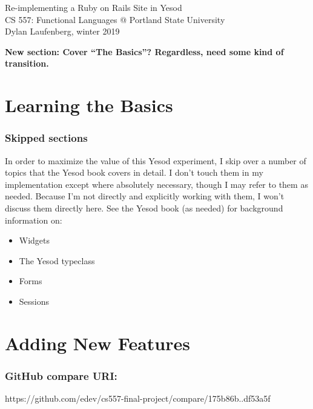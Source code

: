 \documentclass{article}
\newcommand {\todo}[1] {{\textbf{\color{red}#1}}}
\begin{document}
\begin{center}
    \Huge Re-implementing a Ruby on Rails Site in Yesod \\
    \large CS 557: Functional Languages @ Portland State University \\
    Dylan Laufenberg, winter 2019
\end{center}



\todo{New section: Cover ``The Basics''? Regardless, need some kind of transition.}

\part{Learning the Basics}





\section{Skipped sections}

In order to maximize the value of this Yesod experiment, I skip over a number of topics that the Yesod book covers in detail. I don't touch them in my implementation except where absolutely necessary, though I may refer to them as needed. Because I'm not directly and explicitly working with them, I won't discuss them directly here. See the Yesod book (as needed) for background information on:

\begin{itemize}
  \item Widgets
  \item The Yesod typeclass
  \item Forms
  \item Sessions
\end{itemize}

\part{Adding New Features}



% 
% 

\section*{GitHub compare URI:}
https://github.com/edev/cs557-final-project/compare/175b86b..df53a5f
\end{document}
